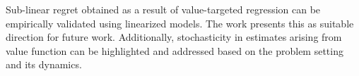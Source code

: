 \documentclass[11pt,letterpaper]{article}
\begin{document}
Sub-linear regret obtained as a result of value-targeted regression can be empirically validated using linearized models. The work presents this as suitable direction for future work. Additionally, stochasticity in estimates arising from value function can be highlighted and addressed based on the problem setting and its dynamics. 
\end{document}
